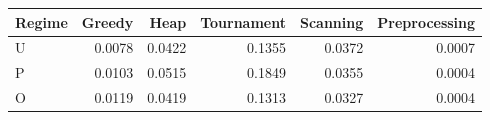 \begin{tabular}{lrrrrr}\toprule
	Regime & Greedy & Heap & Tournament & Scanning & Preprocessing\\\midrule
	U & 0.0078 & 0.0422 & 0.1355 & 0.0372 & 0.0007\\
	P & 0.0103 & 0.0515 & 0.1849 & 0.0355 & 0.0004\\
	O & 0.0119 & 0.0419 & 0.1313 & 0.0327 & 0.0004\\
	\bottomrule
\end{tabular}
